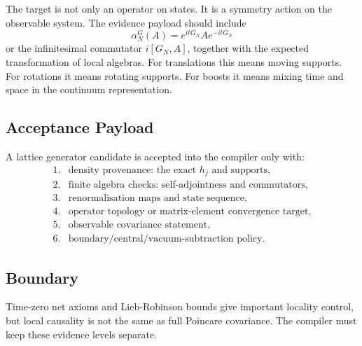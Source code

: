 The target is not only an operator on states.  It is a symmetry action on the
observable system.  The evidence payload should include
\[
  \alpha_N^G(A)=e^{itG_N}Ae^{-itG_N}
\]
or the infinitesimal commutator \(i[G_N,A]\), together with the expected
transformation of local algebras.  For translations this means moving supports.
For rotations it means rotating supports.  For boosts it means mixing time and
space in the continuum representation.

\subsection{Acceptance Payload}

A lattice generator candidate is accepted into the compiler only with:
\[
\begin{array}{ll}
1.&\text{density provenance: the exact }h_j\text{ and supports},\\
2.&\text{finite algebra checks: self-adjointness and commutators},\\
3.&\text{renormalisation maps and state sequence},\\
4.&\text{operator topology or matrix-element convergence target},\\
5.&\text{observable covariance statement},\\
6.&\text{boundary/central/vacuum-subtraction policy}.
\end{array}
\]

\subsection{Boundary}

Time-zero net axioms and Lieb-Robinson bounds give important locality control,
but local causality is not the same as full Poincare covariance.  The compiler
must keep these evidence levels separate.
